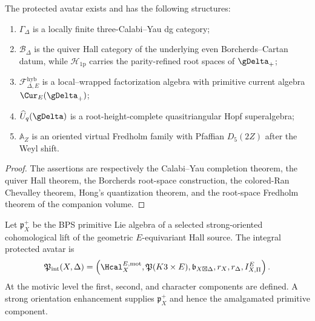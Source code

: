 \begin{theorem}
The protected avatar exists and has the following structures:
\begin{enumerate}
\item $\Gamma_\Delta$ is a locally finite three-Calabi--Yau dg category;
\item $\mathcal B_\Delta$ is the quiver Hall category of the underlying even Borcherds--Cartan datum, while $\mathcal H_{\mathrm{1p}}$ carries the parity-refined root spaces of $\gDelta_+$;
\item $\mathcal F^{\mathrm{hyb}}_{\Delta,E}$ is a local--wrapped factorization algebra with primitive current algebra $\Cur_E(\gDelta_+)$;
\item $\widehat U_q(\gDelta)$ is a root-height-complete quasitriangular Hopf superalgebra;
\item $\mathbb A_Z$ is an oriented virtual Fredholm family with Pfaffian $D_5(2Z)$ after the Weyl shift.
\end{enumerate}
\end{theorem}
\begin{proof}
The assertions are respectively the Calabi--Yau completion theorem, the quiver Hall theorem, the Borcherds root-space construction, the colored-Ran Chevalley theorem, Hong's quantization theorem, and the root-space Fredholm theorem of the companion volume.
\end{proof}

\begin{definition}
Let $\mathfrak p_X^+$ be the BPS primitive Lie algebra of a selected strong-oriented cohomological lift of the geometric $E$-equivariant Hall source.  The integral protected avatar is
\[
 \mathfrak P_{\mathrm{int}}(X,\Delta)
 =\left(
   \Hcal_X^{E,\mathrm{mot}},
   \mathfrak P(K3\times E),
   \mathfrak b_{X\boxtimes\Delta},
   r_X,r_\Delta,
   I_{X,\Pi}^E
 \right).
\]
At the motivic level the first, second, and character components are defined.  A strong orientation enhancement supplies $\mathfrak p_X^+$ and hence the amalgamated primitive component.
\end{definition}

